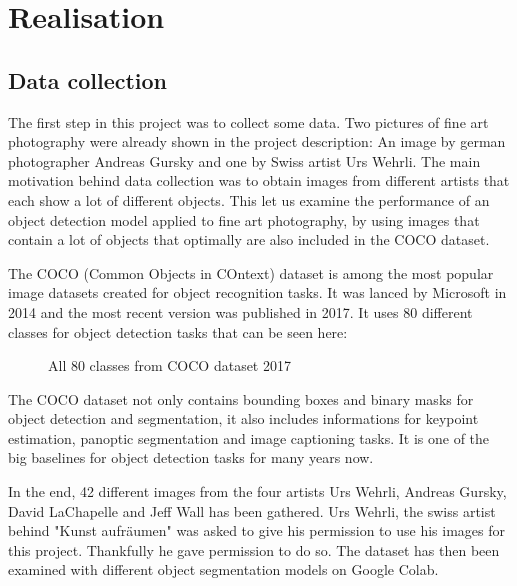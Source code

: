 \chapter{Realisation}

\section{Data collection}

The first step in this project was to collect some data. Two pictures of fine art photography were already shown in the project description: An image by german photographer Andreas Gursky and one by Swiss artist Urs Wehrli. The main motivation behind data collection was to obtain images from different artists that each show a lot of different objects. This let us examine the performance of an object detection model applied to fine art photography, by using images that contain a lot of objects that optimally are also included in the COCO dataset.

The COCO (Common Objects in COntext) dataset is among the most popular image datasets created for object recognition tasks. It was lanced by Microsoft in 2014 and the most recent version was published in 2017. It uses 80 different classes for object detection tasks that can be seen here:

\begin{figure}[!h]
	\caption{\label{fig:input-image} All 80 classes from COCO dataset 2017}
\end{figure}

The COCO dataset not only contains bounding boxes and binary masks for object detection and segmentation, it also includes informations for keypoint estimation, panoptic segmentation and image captioning tasks. It is one of the big baselines for object detection tasks for many years now.

In the end, 42 different images from the four artists Urs Wehrli, Andreas Gursky, David LaChapelle and Jeff Wall has been gathered. Urs Wehrli, the swiss artist behind "Kunst aufräumen" was asked to give his permission to use his images for this project. Thankfully he gave permission to do so. The dataset has then been examined with different object segmentation models on Google Colab.

